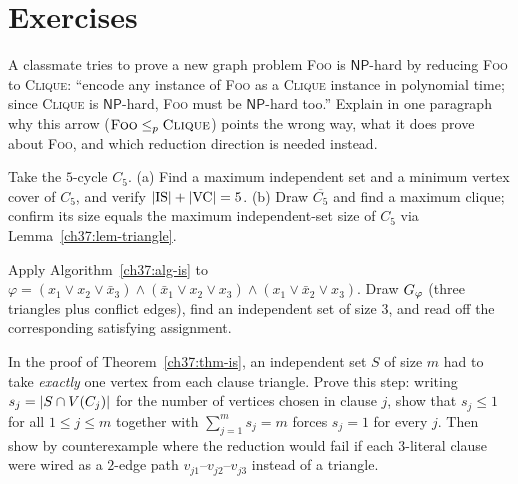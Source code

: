 \section{Exercises}
\label{ch37:exercises}

\begin{exercise}
\label{ch37:ex-direction}
A classmate tries to prove a new graph problem \textsc{Foo} is $\mathsf{NP}$-hard by reducing \textsc{Foo} to \textsc{Clique}: ``encode any instance of \textsc{Foo} as a \textsc{Clique} instance in polynomial time; since \textsc{Clique} is $\mathsf{NP}$-hard, \textsc{Foo} must be $\mathsf{NP}$-hard too.'' Explain in one paragraph why this arrow ($\textsc{Foo}\le_p\textsc{Clique}$) points the wrong way, what it does prove about \textsc{Foo}, and which reduction direction is needed instead.
\end{exercise}

\begin{exercise}
\label{ch37:ex-complement}
Take the $5$-cycle $C_5$. (a) Find a maximum independent set and a minimum
vertex cover of $C_5$, and verify $\lvert\text{IS}\rvert+\lvert\text{VC}\rvert=5$. (b) Draw
$\overline{C_5}$ and find a maximum clique; confirm its size equals the maximum
independent-set size of $C_5$ via Lemma~\ref{ch37:lem-triangle}.
\end{exercise}

\begin{exercise}
\label{ch37:ex-isgadget}
Apply Algorithm~\ref{ch37:alg-is} to
$\varphi=(x_1\vee x_2\vee \bar{x}_3)\wedge(\bar{x}_1\vee x_2\vee x_3)\wedge
(x_1\vee \bar{x}_2\vee x_3)$. Draw $G_\varphi$ (three triangles plus conflict edges),
find an independent set of size $3$, and read off the corresponding satisfying assignment.
\end{exercise}

\begin{exercise}
\label{ch37:ex-trianglecount}
In the proof of Theorem~\ref{ch37:thm-is}, an independent set $S$ of
size $m$ had to take \emph{exactly} one vertex from each clause triangle. Prove this
step: writing $s_j = \lvert S\cap V(C_j)\rvert$ for the number of vertices chosen in clause $j$, show that $s_j\le 1$ for all $1\le j\le m$ together with $\sum_{j=1}^m s_j = m$ forces $s_j=1$ for every $j$. Then show by counterexample where the reduction would fail if each $3$-literal clause were wired as a $2$-edge path $v_{j1}\text{--}v_{j2}\text{--}v_{j3}$ instead of a triangle.
\end{exercise}

